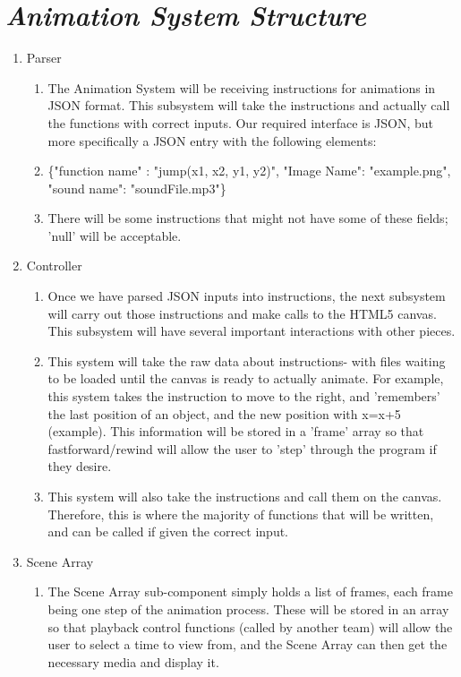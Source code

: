 \documentclass[12pt]{article}
\begin{document}
\section{\emph{Animation System Structure}}%
\begin{enumerate}
\item Parser
\begin{enumerate}
\item The Animation System will be receiving instructions for animations in JSON format. This subsystem will take the instructions and actually call the functions with correct inputs. Our required interface is JSON, but more specifically a JSON entry with the following elements:
\item \{"function name" : "jump(x1, x2, y1, y2)", "Image Name": "example.png", "sound name": "soundFile.mp3"\}
\item There will be some instructions that might not have some of these fields; 'null' will be acceptable.
\end{enumerate}

\item Controller
\begin{enumerate}
\item Once we have parsed JSON inputs into instructions, the next subsystem will carry out those instructions and make calls to the HTML5 canvas. This subsystem will have several important interactions with other pieces.
\item This system will take the raw data about instructions- with files waiting to be loaded until the canvas is ready to actually animate. For example, this system takes the instruction to move to the right, and 'remembers' the last position of an object, and the new position with x=x+5 (example). This information will be stored in a 'frame' array so that fastforward/rewind will allow the user to 'step' through the program if they desire.
\item This system will also take the instructions and call them on the canvas. Therefore, this is where the majority of functions that will be written, and can be called if given the correct input.
\end{enumerate}

\item Scene Array
\begin{enumerate}
\item The Scene Array sub-component simply holds a list of frames, each frame being one step of the animation process. These will be stored in an array so that playback control functions (called by another team) will allow the user to select a time to view from, and the Scene Array can then get the necessary media and display it. 
\end{enumerate}


\end{enumerate}
\end{document}
